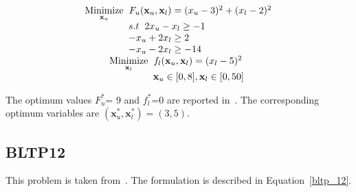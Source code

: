 \begin{equation}
\begin{array}{lr}
\underset{\mathbf{x}_u}{\text{Minimize}}\hspace{2mm} F_u(\mathbf{x}_u, \mathbf{ x}_l)=(x_u-3)^2+(x_l-2)^2\\

\hspace{16mm}s.t\hspace{2mm} 2x_u-x_l\geq -1\\
\hspace{16mm}  -x_u+2x_l \geq 2\\
\hspace{16mm}  -x_u-2x_l \geq -14\\
\hspace{9mm} \underset{\mathbf{x}_l} {\text{Minimize}}\hspace{2mm} f_l(\mathbf{x}_u, \mathbf{ x}_l)=(x_l-5)^2 \\

\hspace{25mm} \mathbf{x}_u \in {[0,8]},\mathbf{x}_l \in [0,50] \\
\end{array}
\label{bltp_11}
\end{equation}

The optimum values $F_u^*$= 9 and  $f_l^*$=0 are reported in~\cite{Angelobilevel}. The corresponding optimum variables are $(\mathbf{x}^*_u, \mathbf{x}^*_l)=(3,5)$.

\subsection{BLTP12}

This problem is taken from~\cite{bard1982explicit}. The formulation is described in Equation~\ref{bltp_12}.

